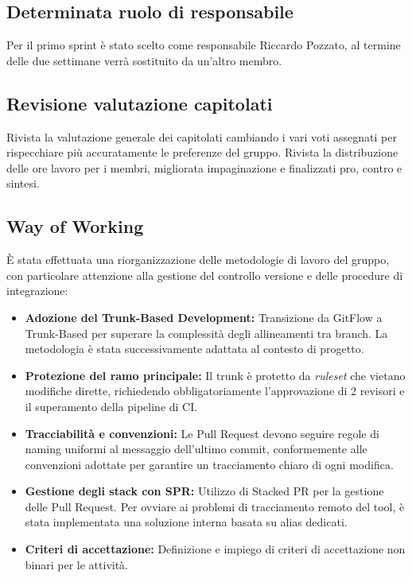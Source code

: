 \documentclass[a4paper, 11pt]{article}
\begin{document}
\subsection{Determinata ruolo di responsabile}
Per il primo sprint è stato scelto come responsabile Riccardo Pozzato, al termine delle due settimane verrà sostituito da un'altro membro.

\subsection{Revisione valutazione capitolati}
Rivista la valutazione generale dei capitolati cambiando i vari voti assegnati per rispecchiare più accuratamente le preferenze del gruppo. Rivista la distribuzione delle ore lavoro per i membri, migliorata impaginazione e finalizzati pro, contro e sintesi.

\subsection{Way of Working}
È stata effettuata una riorganizzazione delle metodologie di lavoro del gruppo, con particolare attenzione alla gestione del controllo versione e delle procedure di integrazione:

\begin{itemize}
    \item \textbf{Adozione del Trunk-Based Development:} Transizione da GitFlow a Trunk-Based per superare la complessità degli allineamenti tra branch. La metodologia è stata successivamente adattata al contesto di progetto.
    \item \textbf{Protezione del ramo principale:} Il trunk è protetto da \textit{ruleset} che vietano modifiche dirette, richiedendo obbligatoriamente l'approvazione di 2 revisori e il superamento della pipeline di CI.
    \item \textbf{Tracciabilità e convenzioni:} Le Pull Request devono seguire regole di naming uniformi al messaggio dell'ultimo commit, conformemente alle convenzioni adottate per garantire un tracciamento chiaro di ogni modifica.
    \item \textbf{Gestione degli stack con SPR:} Utilizzo di Stacked PR per la gestione delle Pull Request. Per ovviare ai problemi di tracciamento remoto del tool, è stata implementata una soluzione interna basata su alias dedicati.
    \item \textbf{Criteri di accettazione:} Definizione e impiego di criteri di accettazione non binari per le attività.
\end{itemize}
\end{document}
